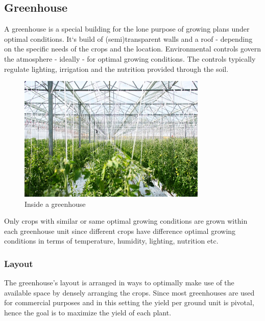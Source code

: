 \graphicspath{{members/ssr/figures/}}

\subsection{Greenhouse}\label{subsec:greenhouse}

A greenhouse is a special building for the lone purpose of growing plans under optimal
conditions. It‘s build of (semi)transparent walls and a roof - depending on the specific
needs of the crops and the location.
Environmental controls govern the atmosphere - ideally - for optimal growing conditions.
The controls typically regulate lighting, irrigation and the nutrition provided through
the soil.\\

\begin{figure}[H]
    \centering
    \includegraphics[width=0.8\textwidth]{user-view/greeenhouse_erwan_hesry_unsplash.jpg}
    \caption{Inside a greenhouse}
\end{figure}

Only crops with similar or same optimal growing conditions are grown within each greenhouse unit
since different crops have difference optimal growing conditions in terms of temperature,
humidity, lighting, nutrition etc.\\

\subsubsection*{Layout}

The greenhouse's layout is arranged in ways to optimally make use of the available space by densely
arranging the crops.
Since most greenhouses are used for commercial purposes and in this setting the yield per ground
unit is pivotal, hence the goal is to maximize the yield of each plant.

